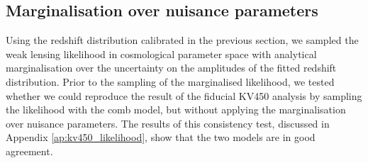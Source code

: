 \documentclass{aa}
\begin{document}
\subsection{Marginalisation over nuisance parameters} 
Using the redshift distribution calibrated in the previous section, we sampled the weak lensing likelihood in cosmological parameter space with analytical marginalisation over the uncertainty on the amplitudes of the fitted redshift distribution. 
Prior to the sampling of the marginalised likelihood, we tested whether we could reproduce the result of the fiducial KV450 analysis by sampling the likelihood with the comb model, but without applying the marginalisation over nuisance parameters. The results of this consistency test, discussed in Appendix \ref{ap:kv450_likelihood}, show that the two models are in good agreement. 
\end{document}
